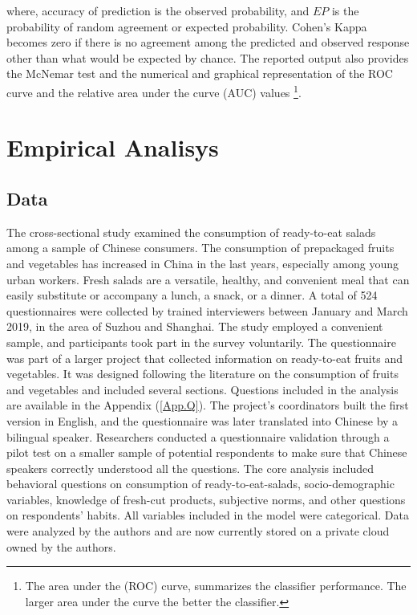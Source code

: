\documentclass[a4,12pt]{article}
\begin{document}
where, accuracy of prediction is the observed probability, and $E P$ is the probability of random agreement or expected probability. Cohen's Kappa becomes zero if there is no agreement among the predicted and observed response other than what would be expected by chance. The reported output also provides the McNemar test and the numerical and graphical representation of the ROC curve and the relative area under the curve (AUC) values \footnote{The area under the (ROC) curve, summarizes the classifier performance. The larger area under the curve the better the classifier.}.

\section{Empirical Analisys }
\label{sec:3}

\subsection{Data} 
The cross-sectional study examined the consumption of ready-to-eat salads among a sample of Chinese consumers. The consumption of prepackaged fruits and vegetables has increased in China in the last years, especially among young urban workers. Fresh salads are a versatile, healthy, and convenient meal that can easily substitute or accompany a lunch, a snack, or a dinner. A total of 524 questionnaires were collected by trained interviewers between January and March 2019, in the area of Suzhou and Shanghai. The study employed a convenient sample, and participants took part in the survey voluntarily.  The questionnaire was part of a larger project that collected information on ready-to-eat fruits and vegetables. It was designed following the literature on the consumption of fruits and vegetables and included several sections. Questions included in the analysis are available in the Appendix (\ref{App.Q}). The project's coordinators built the first version in English, and the questionnaire was later translated into Chinese by a bilingual speaker. Researchers conducted a questionnaire validation through a pilot test on a smaller sample of potential respondents to make sure that Chinese speakers correctly understood all the questions.  The core analysis included behavioral questions on consumption of ready-to-eat-salads, socio-demographic variables, knowledge of fresh-cut products, subjective norms, and other questions on respondents' habits. All variables included in the model were categorical. Data were analyzed by the authors and are now currently stored on a private cloud owned by the authors.
\end{document}
